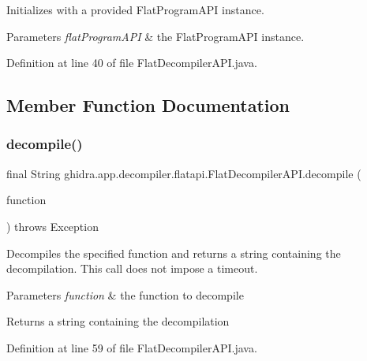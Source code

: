 Initializes with a provided Flat\+Program\+A\+PI instance. 
\begin{DoxyParams}{Parameters}
{\em flat\+Program\+A\+PI} & the Flat\+Program\+A\+PI instance. \\
\hline
\end{DoxyParams}


Definition at line 40 of file Flat\+Decompiler\+A\+P\+I.\+java.



\subsection{Member Function Documentation}
\mbox{\label{classghidra_1_1app_1_1decompiler_1_1flatapi_1_1_flat_decompiler_a_p_i_aa8f1363ab1b6837f3840f4d342f639a4}} 
\subsubsection{\texorpdfstring{decompile()}{decompile()}\hspace{0.1cm}{\footnotesize\ttfamily [1/2]}}
{\footnotesize\ttfamily final String ghidra.\+app.\+decompiler.\+flatapi.\+Flat\+Decompiler\+A\+P\+I.\+decompile (\begin{DoxyParamCaption}\item[{Function}]{function }\end{DoxyParamCaption}) throws Exception\hspace{0.3cm}{\ttfamily [inline]}}

Decompiles the specified function and returns a string containing the decompilation. This call does not impose a timeout. 
\begin{DoxyParams}{Parameters}
{\em function} & the function to decompile \\
\hline
\end{DoxyParams}
\begin{DoxyReturn}{Returns}
a string containing the decompilation 
\end{DoxyReturn}


Definition at line 59 of file Flat\+Decompiler\+A\+P\+I.\+java.

\mbox{\label{classghidra_1_1app_1_1decompiler_1_1flatapi_1_1_flat_decompiler_a_p_i_a83e63ba2faea29732064cee33edab094}} 
